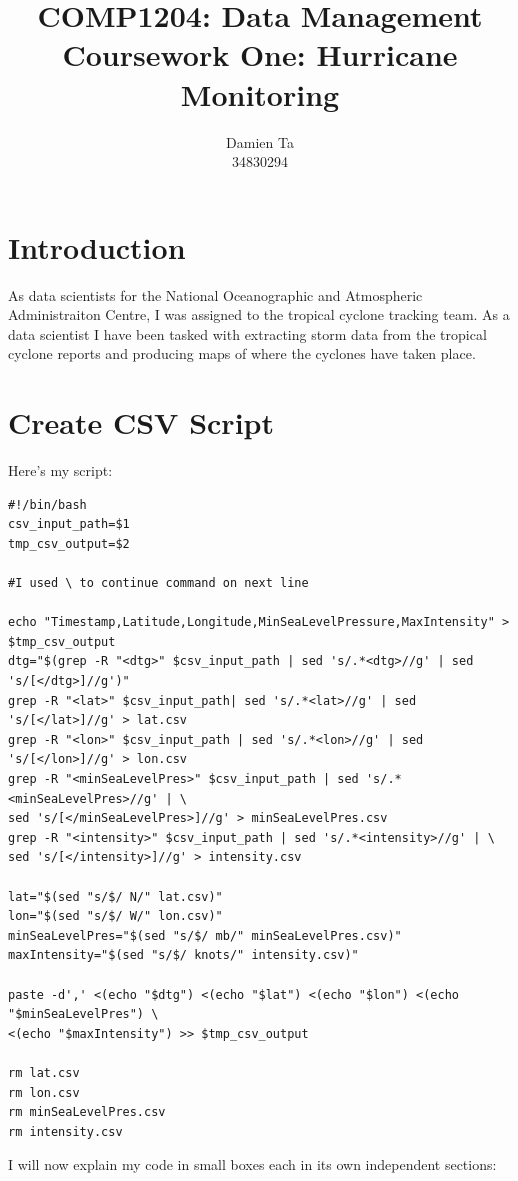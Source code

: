 \documentclass[]{article}
\title{COMP1204: Data Management \\ Coursework One: Hurricane Monitoring }
\author{Damien Ta \\ 34830294}
\begin{document}
\maketitle

\section{Introduction}
As data scientists for the National Oceanographic and Atmospheric Administraiton Centre, I was assigned to the tropical cyclone
tracking team. As a data scientist I have been tasked with extracting storm data from the tropical cyclone reports and producing
maps of where the cyclones have taken place.
\section{Create CSV Script}
Here's my script:
\begin{tcolorbox}[colback=white, colframe=black, boxrule=0.5pt, arc=2mm, 
    title=create\_csv.sh, fonttitle=\bfseries, listing only, listing options={language=sh, basicstyle=\ttfamily}]
    \begin{verbatim}
#!/bin/bash
csv_input_path=$1
tmp_csv_output=$2

#I used \ to continue command on next line

echo "Timestamp,Latitude,Longitude,MinSeaLevelPressure,MaxIntensity" > $tmp_csv_output
dtg="$(grep -R "<dtg>" $csv_input_path | sed 's/.*<dtg>//g' | sed 's/[</dtg>]//g')"
grep -R "<lat>" $csv_input_path| sed 's/.*<lat>//g' | sed 's/[</lat>]//g' > lat.csv
grep -R "<lon>" $csv_input_path | sed 's/.*<lon>//g' | sed 's/[</lon>]//g' > lon.csv
grep -R "<minSeaLevelPres>" $csv_input_path | sed 's/.*<minSeaLevelPres>//g' | \
sed 's/[</minSeaLevelPres>]//g' > minSeaLevelPres.csv
grep -R "<intensity>" $csv_input_path | sed 's/.*<intensity>//g' | \ 
sed 's/[</intensity>]//g' > intensity.csv

lat="$(sed "s/$/ N/" lat.csv)"
lon="$(sed "s/$/ W/" lon.csv)"
minSeaLevelPres="$(sed "s/$/ mb/" minSeaLevelPres.csv)"
maxIntensity="$(sed "s/$/ knots/" intensity.csv)"

paste -d',' <(echo "$dtg") <(echo "$lat") <(echo "$lon") <(echo "$minSeaLevelPres") \
<(echo "$maxIntensity") >> $tmp_csv_output

rm lat.csv
rm lon.csv
rm minSeaLevelPres.csv
rm intensity.csv
    \end{verbatim}
\end{tcolorbox}
I will now explain my code in small boxes each in its own independent sections:
\end{document}
